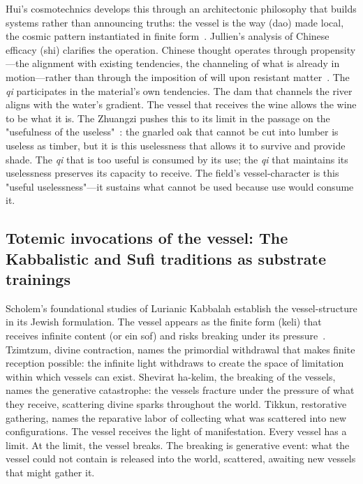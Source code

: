 Hui's cosmotechnics develops this through an architectonic philosophy that builds systems rather than announcing truths: the vessel is the way (dao) made local, the cosmic pattern instantiated in finite form~\cite{hui2016}. Jullien's analysis of Chinese efficacy (shi) clarifies the operation. Chinese thought operates through propensity---the alignment with existing tendencies, the channeling of what is already in motion---rather than through the imposition of will upon resistant matter~\cite{jullien1992}. The \textit{qi} participates in the material's own tendencies. The dam that channels the river aligns with the water's gradient. The vessel that receives the wine allows the wine to be what it is. The Zhuangzi pushes this to its limit in the passage on the "usefulness of the useless"~\cite[ch.~4]{ziporyn2009}: the gnarled oak that cannot be cut into lumber is useless as timber, but it is this uselessness that allows it to survive and provide shade. The \textit{qi} that is too useful is consumed by its use; the \textit{qi} that maintains its uselessness preserves its capacity to receive. The field's vessel-character is this "useful uselessness"---it sustains what cannot be used because use would consume it.

\subsection{Totemic invocations of the vessel: The Kabbalistic and Sufi traditions as substrate trainings}

Scholem's foundational studies of Lurianic Kabbalah establish the vessel-structure in its Jewish formulation. The vessel appears as the finite form (keli) that receives infinite content (or ein sof) and risks breaking under its pressure~\cite{scholem1946}. Tzimtzum, divine contraction, names the primordial withdrawal that makes finite reception possible: the infinite light withdraws to create the space of limitation within which vessels can exist. Shevirat ha-kelim, the breaking of the vessels, names the generative catastrophe: the vessels fracture under the pressure of what they receive, scattering divine sparks throughout the world. Tikkun, restorative gathering, names the reparative labor of collecting what was scattered into new configurations. The vessel receives the light of manifestation. Every vessel has a limit. At the limit, the vessel breaks. The breaking is generative event: what the vessel could not contain is released into the world, scattered, awaiting new vessels that might gather it.

